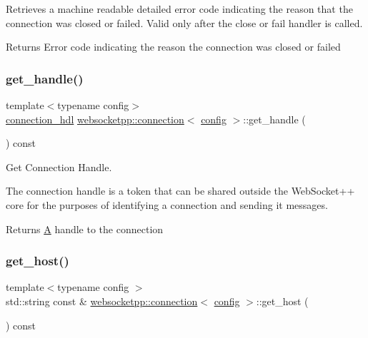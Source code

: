 Retrieves a machine readable detailed error code indicating the reason that the connection was closed or failed. Valid only after the close or fail handler is called.

\begin{DoxyReturn}{Returns}
Error code indicating the reason the connection was closed or failed 
\end{DoxyReturn}
\mbox{\label{classwebsocketpp_1_1connection_a6a28147e2f3f4c1fb37f29a234e772bc}} 
\subsubsection{\texorpdfstring{get\+\_\+handle()}{get\_handle()}}
{\footnotesize\ttfamily template$<$typename config$>$ \\
\mbox{\hyperlink{namespacewebsocketpp_a6b3d26a10ee7229b84b776786332631d}{connection\+\_\+hdl}} \mbox{\hyperlink{classwebsocketpp_1_1connection}{websocketpp\+::connection}}$<$ \mbox{\hyperlink{classconfig}{config}} $>$\+::get\+\_\+handle (\begin{DoxyParamCaption}{ }\end{DoxyParamCaption}) const\hspace{0.3cm}{\ttfamily [inline]}}



Get Connection Handle. 

The connection handle is a token that can be shared outside the Web\+Socket++ core for the purposes of identifying a connection and sending it messages.

\begin{DoxyReturn}{Returns}
\mbox{\hyperlink{struct_a}{A}} handle to the connection 
\end{DoxyReturn}
\mbox{\label{classwebsocketpp_1_1connection_a47e91744f959876b9fef4b18b04a809a}} 
\subsubsection{\texorpdfstring{get\+\_\+host()}{get\_host()}}
{\footnotesize\ttfamily template$<$typename config $>$ \\
std\+::string const  \& \mbox{\hyperlink{classwebsocketpp_1_1connection}{websocketpp\+::connection}}$<$ \mbox{\hyperlink{classconfig}{config}} $>$\+::get\+\_\+host (\begin{DoxyParamCaption}{ }\end{DoxyParamCaption}) const}



